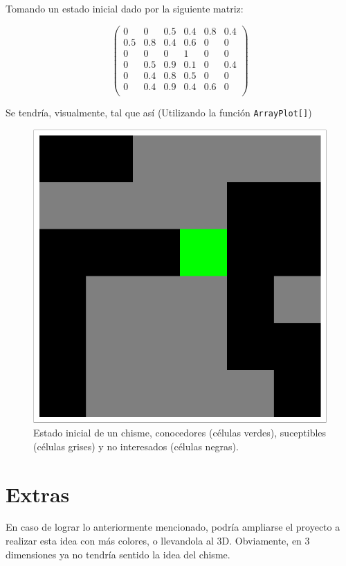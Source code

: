 Tomando un estado inicial dado por la siguiente matriz:

$$
\left(
\begin{array}{cccccc}
 0 & 0 & 0.5 & 0.4 & 0.8 & 0.4 \\
 0.5 & 0.8 & 0.4 & 0.6 & 0 & 0 \\
 0 & 0 & 0 & 1 & 0 & 0 \\
 0 & 0.5 & 0.9 & 0.1 & 0 & 0.4 \\
 0 & 0.4 & 0.8 & 0.5 & 0 & 0 \\
 0 & 0.4 & 0.9 & 0.4 & 0.6 & 0 \\
\end{array}
\right)
$$

Se tendría, visualmente, tal que así (Utilizando la función \texttt{ArrayPlot[]})

\begin{figure}[H]
	\centering
	\includegraphics[scale=0.5]{./img/array.pdf}
	\caption{Estado inicial de un chisme, conocedores (células verdes), suceptibles (células grises) y no interesados (células negras).}
\end{figure}




\section*{Extras}
En caso de lograr lo anteriormente mencionado, podría ampliarse el proyecto a realizar esta idea con más colores, o llevandola al 3D. Obviamente, en 3 dimensiones ya no tendría sentido la idea del chisme.


